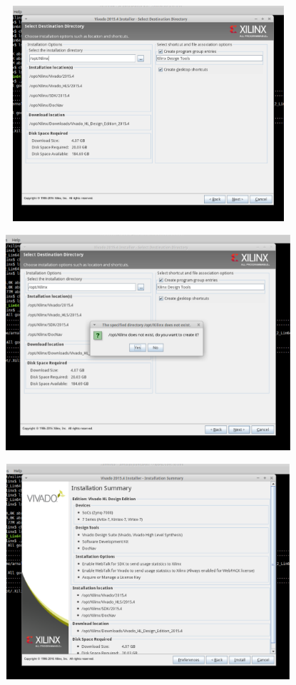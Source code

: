 \documentclass[a4paper,11pt]{article}
\begin{document}
    \begin{center}
    \includegraphics[height=8cm,width=12cm]{vivado_installer_5}
    \end{center}

    \begin{center}
    \includegraphics[height=8cm,width=12cm]{vivado_installer_6}
    \end{center}

    \begin{center}
    \includegraphics[height=8cm,width=12cm]{vivado_installer_7}
    \end{center}
\end{document}
